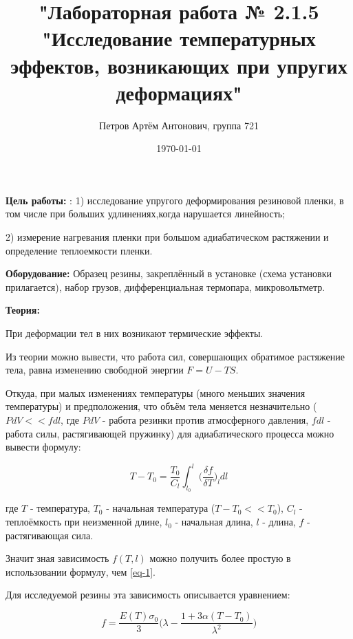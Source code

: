 \documentclass[a4paper,12pt]{article}
\author{Петров Артём Антонович, группа 721}
\title{"Лабораторная работа № 2.1.5 "Исследование температурных эффектов, возникающих при упругих деформациях"}
\date{\today}
\begin{document}

\begin{minipage}[t][8cm]{\textwidth}
\maketitle
\end{minipage}


\textbf{Цель работы:} : 1) исследование упругого деформирования резиновой пленки, в том числе при больших удлинениях,когда нарушается линейность; 

2) измерение нагревания пленки при большом адиабатическом растяжении и определение теплоемкости пленки.
\bigskip

\textbf{Оборудование:} Образец резины, закреплённый в установке (схема установки прилагается), набор грузов, дифференциальная термопара, микровольтметр. 
\bigskip

\textbf{Теория:}
\bigskip

При деформации тел в них возникают термические эффекты.

Из теории можно вывести, что работа сил, совершающих обратимое растяжение тела, равна изменению свободной энергии $F = U - TS$.

Откуда, при малых изменениях температуры (много меньших значения температуры) и предположения, что объём тела меняется незначительно ($PdV << fdl$, где $PdV$ - работа резинки против атмосферного давления, $fdl$ - работа силы, растягивающей пружинку) для адиабатического процесса можно вывести формулу:

\begin{equation} \label{eq-1}
T - T_0 = \frac{T_0}{C_l} \int_{l_0}^{l} \bigg( \frac{\delta f}{\delta T} \bigg)_l dl
\end{equation}

где $T$ - температура, $T_0$ - начальная температура ($T - T_0 << T_0$), $C_l$ - теплоёмкость при неизменной длине, $l_0$ - начальная длина, $l$ - длина, $f$ - растягивающая сила.

Значит зная зависимость $f(T, l)$ можно получить более простую в использовании формулу, чем \ref{eq-1}.

Для исследуемой резины эта зависимость описывается уравнением:

\begin{equation} \label{eq-2}
f = \frac{E(T)\sigma_0}{3} \bigg( \lambda - \frac{1+3\alpha(T-T_0)}{\lambda^2} \bigg)
\end{equation}
\end{document}
